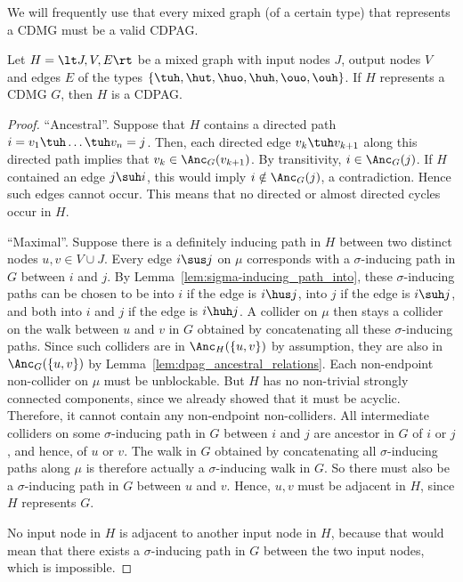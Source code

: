 We will frequently use that every mixed graph (of a certain type) that represents a CDMG must be a valid CDPAG.
\begin{Prp}\label{prp:dpag_represents_dmg_is_valid}
Let $H = \lt J,V,E\rt$ be a mixed graph with input nodes $J$, output nodes $V$ and edges $E$ of the types $\{\tuh,\hut,\huo,\huh,\ouo,\ouh\}$.
If $H$ represents a CDMG $G$, then $H$ is a CDPAG.
\end{Prp}
\begin{proof}
  ``Ancestral''. Suppose that $H$ contains a directed path $i = v_1 \tuh \dots \tuh v_n = j$.
  Then, each directed edge $v_k \tuh v_{k+1}$ along this directed path implies that $v_k \in \Anc_G(v_{k+1})$. 
  By transitivity, $i \in \Anc_G(j)$. 
  If $H$ contained an edge $j \suh i$, this would imply $i \notin \Anc_G(j)$, a contradiction. 
  Hence such edges cannot occur.
  This means that no directed or almost directed cycles occur in $H$.

  ``Maximal''.
  Suppose there is a definitely inducing path in $H$ between two distinct nodes $u,v \in V \cup J$. 
  Every edge $i \sus j$ on $\mu$ corresponds with a $\sigma$-inducing path in $G$ between $i$ and $j$.
  By Lemma~\ref{lem:sigma-inducing_path_into}, these $\sigma$-inducing paths can be chosen to be into $i$ if the edge is $i \hus j$, into $j$ if the edge is $i \suh j$, and both into $i$ and $j$ if the edge is $i \huh j$. 
  A collider on $\mu$ then stays a collider on the walk between $u$ and $v$ in $G$ obtained by concatenating all these $\sigma$-inducing paths.
  Since such colliders are in $\Anc_H(\{u,v\})$ by assumption, they are also in $\Anc_G(\{u,v\})$ by Lemma~\ref{lem:dpag_ancestral_relations}.
  Each non-endpoint non-collider on $\mu$ must be unblockable.
  But $H$ has no non-trivial strongly connected components, since we already showed that it must be acyclic.
  Therefore, it cannot contain any non-endpoint non-colliders.
  All intermediate colliders on some $\sigma$-inducing path in $G$ between $i$ and $j$ are ancestor in $G$ of $i$ or $j$, and hence, of $u$ or $v$.
  The walk in $G$ obtained by concatenating all $\sigma$-inducing paths along $\mu$ is therefore actually a $\sigma$-inducing walk in $G$.
  So there must also be a $\sigma$-inducing path in $G$ between $u$ and $v$.
  Hence, $u,v$ must be adjacent in $H$, since $H$ represents $G$.

  No input node in $H$ is adjacent to another input node in $H$, because that would mean that there exists a $\sigma$-inducing path in $G$ between the two input nodes, which is impossible.
\end{proof}


